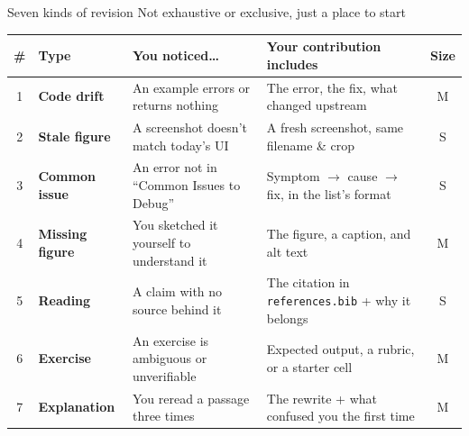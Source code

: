 \documentclass[9pt,aspectratio=169]{beamer}
\begin{document}
\begin{frame}{Seven kinds of revision}
    Not exhaustive or exclusive, just a place to start
    \begin{table}
    \centering
    \scriptsize
    \begin{tabular}{clll c}
        \toprule
        \textbf{\#} & \textbf{Type} & \textbf{You noticed\ldots} & \textbf{Your contribution includes} & \textbf{Size} \\ \midrule
        1 & \textbf{Code drift} & An example errors or returns nothing & The error, the fix, what changed upstream & M \\
        2 & \textbf{Stale figure} & A screenshot doesn't match today's UI & A fresh screenshot, same filename \& crop & S \\
        3 & \textbf{Common issue} & An error not in ``Common Issues to Debug'' & Symptom $\rightarrow$ cause $\rightarrow$ fix, in the list's format & S \\
        4 & \textbf{Missing figure} & You sketched it yourself to understand it & The figure, a caption, and alt text & M \\
        5 & \textbf{Reading} & A claim with no source behind it & The citation in \texttt{references.bib} + why it belongs & S \\
        6 & \textbf{Exercise} & An exercise is ambiguous or unverifiable & Expected output, a rubric, or a starter cell & M \\
        7 & \textbf{Explanation} & You reread a passage three times & The rewrite + what confused you the first time & M \\
        \bottomrule
    \end{tabular}
    \end{table}
\end{frame}
\end{document}

